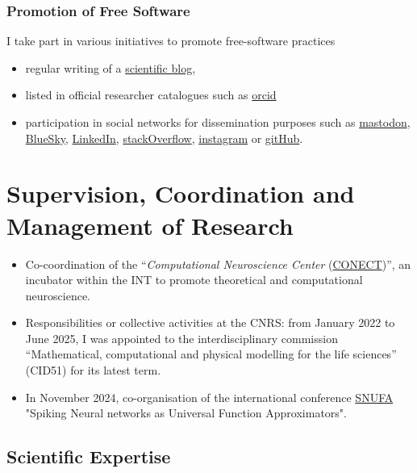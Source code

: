 \documentclass[10pt,english,a4paper,oneside]{article}%
\begin{document}
\subsubsection{Promotion of Free Software} %
I take part in various initiatives to promote free-software practices
\begin{itemize}
	\item regular writing of a \href{https://laurentperrinet.github.io/sciblog/}{scientific blog},
	\item listed in official researcher catalogues such as \href{http://orcid.org/0000-0002-9536-010X}{orcid}
	\item participation in social networks for dissemination purposes such as \href{https://neuromatch.social/@laurentperrinet}{mastodon}, \href{https://bsky.app/profile/laurentperrinet.bsky.social}{BlueSky}, \href{https://www.linkedin.com/in/laurent-perrinet-1857b9/}{LinkedIn}, \href{https://stackoverflow.com/users/234547/meduz}{stackOverflow}, \href{https://www.instagram.com/laurentperrinet/}{instagram} or \href{https://github.com/laurentperrinet}{gitHub}.
\end{itemize}




\section{Supervision, Coordination and Management of Research}

\begin{itemize}

	\item Co-coordination of the ``\textit{Computational Neuroscience Center} (\href{https://conect-int.github.io/}{CONECT})'', an incubator within the INT to promote theoretical and computational neuroscience.

    \item Responsibilities or collective activities at the CNRS: from January 2022 to June 2025, I was appointed to the interdisciplinary commission ``Mathematical, computational and physical modelling for the life sciences'' (CID51) for its latest term.

	\item In November 2024, co-organisation of the international conference \href{https://laurentperrinet.github.io/post/2024-11-08-snufa/}{SNUFA} "Spiking Neural networks as Universal Function Approximators".
\end{itemize}

\subsection{Scientific Expertise} %
\end{document}
